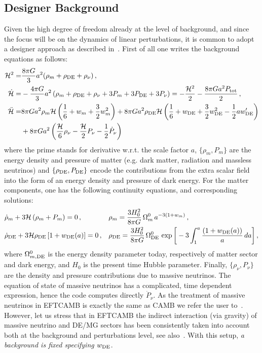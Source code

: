 \documentclass[prd,nofootinbib,showpacs]{revtex4}
\def\hub{{\mathcal H}}
\begin{document}
{\subsection{Designer Background} \label{SubSec:EFTDesignerBackground}
%
Given the high degree of freedom already at the level of background, and since the focus will be on the dynamics of linear perturbations, it is common to adopt a designer approach as described in~\cite{Gubitosi:2012hu,Bloomfield:2012ff}. First of all one writes the background equations as follows:
%
\begin{align}
\mathcal{H}^2 =& \frac{8\pi G}{3} a^2 (\rho_m + \rho_{\rm DE} + \rho_{\nu})  \, ,\nonumber\\
\dot{\mathcal{H}} =& -\frac{4\pi G}{3} a^2 \left(\rho_m + \rho_{\rm DE} + \rho_{\nu} + 3P_m + 3 P_{\rm DE} + 3 P_{\nu} \right) = -\frac{\mathcal{H}^2}{2} - \frac{8 \pi G a^2 P_{\rm tot}}{2} \, ,\nonumber\\
\ddot{\mathcal{H}} =& 8 \pi G a^2 \rho_m \mathcal{H}\left(\frac{1}{6}+ w_m+\frac{3}{2}w_m^2\right) +  8 \pi G a^2 \rho_{\rm DE}\mathcal{H}\left( \frac{1}{6}+w_{\rm DE}+\frac{3}{2}w_{\rm DE}^2-\frac{1}{2}aw_{\rm DE}^{\prime} \right) \nonumber \\
  & +8 \pi G a^2 \left( \frac{\hub}{6}\rho_{\nu} -\frac{\hub}{2}P_{\nu} -\frac{1}{2}\dot{P}_{\nu} \right)
\label{Eq:BackDesigner}
\end{align}
%
where the prime stands for derivative w.r.t. the scale factor $a$, $\{\rho_m,P_m\}$ are the energy density and pressure of  matter (e.g.  dark matter, radiation and massless neutrinos)  and $\{\rho_{\rm DE},P_{\rm DE}\}$ encode the contributions from the extra scalar field into the form of an energy density and pressure of dark energy. For the matter components, one has the following continuity equations, and corresponding solutions:
\begin{align}
& \dot{\rho}_{m} + 3 \mathcal{H}\left(\rho_{m} + P_{m} \right)=0 \, ,& & \rho_{m}=\frac{3 H_0^2}{8 \pi G} \,\Omega_{m}^0\, a^{-3(1+w_m)} \, , \nonumber\\
& \dot{\rho}_{\rm DE} + 3 \mathcal{H}\rho_{\rm DE}\left[1 + w_{\rm DE}(a) \right]=0\, , & &  \rho_{\rm DE}= \frac{3 H_0^2}{8 \pi G}\, \Omega_{\rm DE}^0 \, \exp \bigg[-3 \int_{1}^{a}\frac{(1+w_{\rm DE}(a))}{a} \,da \bigg] \, ,
\label{Eq:BackContinuity}
\end{align}
where $\Omega^0_{m,\rm DE}$ is the energy density parameter  today, respectively of matter sector and dark energy, and $H_0$ is the present time Hubble parameter. 
Finally, $\{\rho_{\nu}, P_{\nu} \}$ are the density and pressure contributions due to massive neutrinos. The equation of state of massive neutrinos has a complicated, time dependent expression, hence the code computes directly $\dot{P}_{\nu}$. As the treatment of massive neutrinos in EFTCAMB  is  exactly the same as CAMB we refer the user to~\cite{Ma:1995ey,cambnotes}. However, let us stress that  in EFTCAMB  the indirect interaction (via gravity) of massive neutrino and DE/MG sectors  has been consistently taken into account both at the background and perturbations level, see also~\cite{Hu:2014sea}. With this setup, \emph{a background is fixed specifying $w_{\rm DE}$}. 
}
\end{document}
